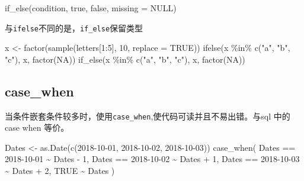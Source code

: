 \documentclass[
]{book}
\newenvironment{Shaded}{\begin{snugshade}}{\end{snugshade}}
\newcommand{\AttributeTok}[1]{\textcolor[rgb]{0.77,0.63,0.00}{#1}}
\newcommand{\ConstantTok}[1]{\textcolor[rgb]{0.00,0.00,0.00}{#1}}
\newcommand{\DecValTok}[1]{\textcolor[rgb]{0.00,0.00,0.81}{#1}}
\newcommand{\FunctionTok}[1]{\textcolor[rgb]{0.00,0.00,0.00}{#1}}
\newcommand{\NormalTok}[1]{#1}
\newcommand{\OtherTok}[1]{\textcolor[rgb]{0.56,0.35,0.01}{#1}}
\newcommand{\SpecialCharTok}[1]{\textcolor[rgb]{0.00,0.00,0.00}{#1}}
\newcommand{\StringTok}[1]{\textcolor[rgb]{0.31,0.60,0.02}{#1}}
\begin{document}
\begin{Shaded}
\begin{Highlighting}[]
\FunctionTok{if\_else}\NormalTok{(condition, true, false, }\AttributeTok{missing =} \ConstantTok{NULL}\NormalTok{)}
\end{Highlighting}
\end{Shaded}

与\texttt{ifelse}不同的是，\texttt{if\_else}保留类型

\begin{Shaded}
\begin{Highlighting}[]
\NormalTok{x }\OtherTok{\textless{}{-}} \FunctionTok{factor}\NormalTok{(}\FunctionTok{sample}\NormalTok{(letters[}\DecValTok{1}\SpecialCharTok{:}\DecValTok{5}\NormalTok{], }\DecValTok{10}\NormalTok{, }\AttributeTok{replace =} \ConstantTok{TRUE}\NormalTok{))}
\FunctionTok{ifelse}\NormalTok{(x }\SpecialCharTok{\%in\%} \FunctionTok{c}\NormalTok{(}\StringTok{"a"}\NormalTok{, }\StringTok{"b"}\NormalTok{, }\StringTok{"c"}\NormalTok{), x, }\FunctionTok{factor}\NormalTok{(}\ConstantTok{NA}\NormalTok{))}
\FunctionTok{if\_else}\NormalTok{(x }\SpecialCharTok{\%in\%} \FunctionTok{c}\NormalTok{(}\StringTok{"a"}\NormalTok{, }\StringTok{"b"}\NormalTok{, }\StringTok{"c"}\NormalTok{), x, }\FunctionTok{factor}\NormalTok{(}\ConstantTok{NA}\NormalTok{))}
\end{Highlighting}
\end{Shaded}

\hypertarget{case_when}{%
\subsection{case\_when}\label{case_when}}

当条件嵌套条件较多时，使用\texttt{case\_when},使代码可读并且不易出错。与sql 中的case when 等价。

\begin{Shaded}
\begin{Highlighting}[]
\NormalTok{Dates }\OtherTok{\textless{}{-}} \FunctionTok{as.Date}\NormalTok{(}\FunctionTok{c}\NormalTok{(}\StringTok{\textquotesingle{}2018{-}10{-}01\textquotesingle{}}\NormalTok{, }\StringTok{\textquotesingle{}2018{-}10{-}02\textquotesingle{}}\NormalTok{, }\StringTok{\textquotesingle{}2018{-}10{-}03\textquotesingle{}}\NormalTok{))}
\FunctionTok{case\_when}\NormalTok{(}
\NormalTok{  Dates }\SpecialCharTok{==} \StringTok{\textquotesingle{}2018{-}10{-}01\textquotesingle{}} \SpecialCharTok{\textasciitilde{}}\NormalTok{ Dates }\SpecialCharTok{{-}} \DecValTok{1}\NormalTok{,}
\NormalTok{  Dates }\SpecialCharTok{==} \StringTok{\textquotesingle{}2018{-}10{-}02\textquotesingle{}} \SpecialCharTok{\textasciitilde{}}\NormalTok{ Dates }\SpecialCharTok{+} \DecValTok{1}\NormalTok{,}
\NormalTok{  Dates }\SpecialCharTok{==} \StringTok{\textquotesingle{}2018{-}10{-}03\textquotesingle{}} \SpecialCharTok{\textasciitilde{}}\NormalTok{ Dates }\SpecialCharTok{+} \DecValTok{2}\NormalTok{,}
  \ConstantTok{TRUE} \SpecialCharTok{\textasciitilde{}}\NormalTok{ Dates}
\NormalTok{)}
\end{Highlighting}
\end{Shaded}
\end{document}
